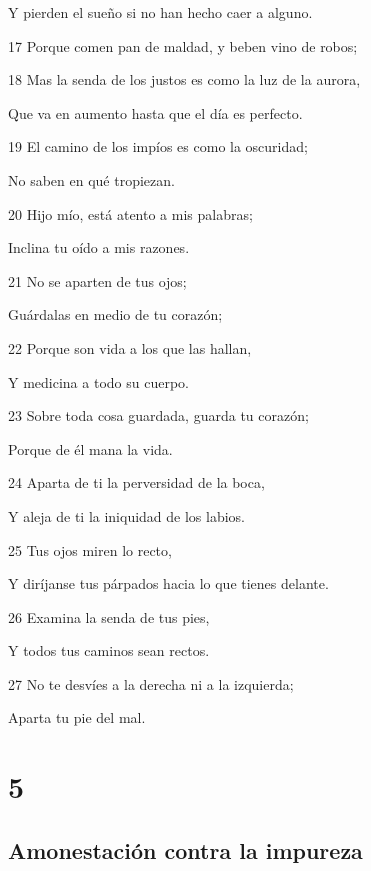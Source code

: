 \par Y pierden el sueño si no han hecho caer a alguno.
\par 17 Porque comen pan de maldad, y beben vino de robos;
\par 18 Mas la senda de los justos es como la luz de la aurora,
\par Que va en aumento hasta que el día es perfecto.
\par 19 El camino de los impíos es como la oscuridad;
\par No saben en qué tropiezan.
\par 20 Hijo mío, está atento a mis palabras;
\par Inclina tu oído a mis razones.
\par 21 No se aparten de tus ojos;
\par Guárdalas en medio de tu corazón;
\par 22 Porque son vida a los que las hallan,
\par Y medicina a todo su cuerpo.
\par 23 Sobre toda cosa guardada, guarda tu corazón;
\par Porque de él mana la vida.
\par 24 Aparta de ti la perversidad de la boca,
\par Y aleja de ti la iniquidad de los labios.
\par 25 Tus ojos miren lo recto,
\par Y diríjanse tus párpados hacia lo que tienes delante.
\par 26 Examina la senda de tus pies, 
\par Y todos tus caminos sean rectos.
\par 27 No te desvíes a la derecha ni a la izquierda;
\par Aparta tu pie del mal.

\chapter{5}

\section*{Amonestación contra la impureza}

